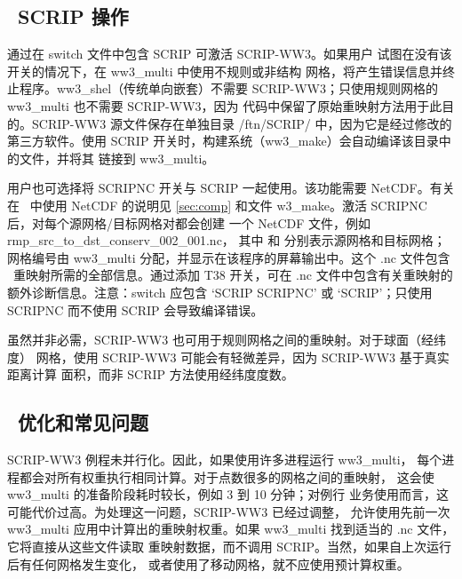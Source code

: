 \vssub
\subsection{~SCRIP 操作} \label{sec:scripC}
\vssub

通过在 {\file switch} 文件中包含 {\F SCRIP} 可激活 SCRIP-WW3。如果用户
试图在没有该开关的情况下，在 {\file ww3\_multi} 中使用不规则或非结构
网格，将产生错误信息并终止程序。{\file ww3\_shel}（传统单向嵌套）不需要
SCRIP-WW3；只使用规则网格的 {\file ww3\_multi} 也不需要 SCRIP-WW3，因为
代码中保留了原始重映射方法用于此目的。SCRIP-WW3 源文件保存在单独目录
{\dir /ftn/SCRIP/} 中，因为它是经过修改的第三方软件。使用 {\F SCRIP}
开关时，构建系统（{\file ww3\_make}）会自动编译该目录中的文件，并将其
链接到 {\file ww3\_multi}。

用户也可选择将 {\F SCRIPNC} 开关与 {\F SCRIP} 一起使用。该功能需要
NetCDF。有关在 \ws\ 中使用 NetCDF 的说明见 \para\ref{sec:comp} 和文件
{\file w3\_make}。激活 {\F SCRIPNC} 后，对每个源网格/目标网格对都会创建
一个 NetCDF 文件，例如 {\file rmp\_src\_to\_dst\_conserv\_002\_001.nc}，
其中 {} 和 {} 分别表示源网格和目标网格；网格编号由
{\file ww3\_multi} 分配，并显示在该程序的屏幕输出中。这个 {\file .nc}
文件包含 \ws\ 重映射所需的全部信息。通过添加 {\F T38} 开关，可在
{\file .nc} 文件中包含有关重映射的额外诊断信息。注意：{\file switch}
应包含 {\F `SCRIP SCRIPNC'} 或 {\F `SCRIP'}；只使用 {\F SCRIPNC} 而不使用
{\F SCRIP} 会导致编译错误。

虽然并非必需，SCRIP-WW3 也可用于规则网格之间的重映射。对于球面（经纬度）
网格，使用 SCRIP-WW3 可能会有轻微差异，因为 SCRIP-WW3 基于真实距离计算
面积，而非 SCRIP 方法使用经纬度度数。

\vssub
\subsection{~优化和常见问题} \label{sec:scripD}
\vssub

SCRIP-WW3 例程未并行化。因此，如果使用许多进程运行 {\file ww3\_multi}，
每个进程都会对所有权重执行相同计算。对于点数很多的网格之间的重映射，
这会使 {\file ww3\_multi} 的准备阶段耗时较长，例如 3 到 10 分钟；对例行
业务使用而言，这可能代价过高。为处理这一问题，SCRIP-WW3 已经过调整，
允许使用先前一次 {\file ww3\_multi} 应用中计算出的重映射权重。如果
{\file ww3\_multi} 找到适当的 {\file .nc} 文件，它将直接从这些文件读取
重映射数据，而不调用 SCRIP。当然，如果自上次运行后有任何网格发生变化，
或者使用了移动网格，就不应使用预计算权重。

